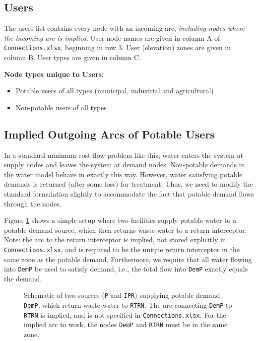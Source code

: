 \documentclass[11pt]{article}
\newcommand{\connections}{\texttt{Connections.xlsx}}
\begin{document}
\subsection{Users}
\label{ssec:users}

The users list contains every node with an incoming arc, \emph{including nodes where the incoming arc is implied}.
User node names are given in column A of \connections, beginning in row 3.
User (elevation) zones are given in column B.
User types are given in column C.

\textbf{Node types unique to Users:}
\begin{itemize}
	\item Potable users of all types (municipal, industrial and agricultural)
	\item Non-potable users of all types
\end{itemize}

\subsection{Implied Outgoing Arcs of Potable Users}
\label{ssec:potableusers}

In a standard minimum cost flow problem like this, water enters the system at supply nodes and leaves the system at demand nodes.
Non-potable demands in the water model behave in exactly this way.
However, water satisfying potable demands is returned (after some loss) for treatment.
Thus, we need to modify the standard formulation slightly to accommodate the fact that potable demand flows through the nodes.

Figure \ref{fig:demand1} shows a simple setup where two facilities supply potable water to a potable demand source, which then returns waste-water to a return interceptor.
Note: the arc to the return interceptor is implied, not stored explicitly in \connections, and is required to be the unique return interceptor in the same zone as the potable demand.
Furthermore, we require that all water flowing into \texttt{DemP} be used to satisfy demand, i.e., the total flow into \texttt{DemP} exactly equals the demand.

\begin{figure}[ht]
	\centering
	\caption{
		Schematic of two sources (\texttt{P} and \texttt{IPR}) supplying potable demand \texttt{DemP}, which return waste-water to \texttt{RTRN}.
		The arc connecting \texttt{DemP} to \texttt{RTRN} is implied, and is not specified in \connections.
		For the implied arc to work, the nodes \texttt{DemP} and \texttt{RTRN} must be in the same zone.
	}
	\label{fig:demand1}
\end{figure}
\end{document}
